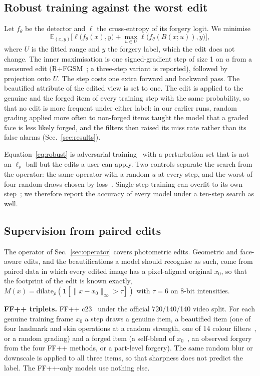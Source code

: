 \subsection{Robust training against the worst edit}
\label{sec:robust}
Let $f_\theta$ be the detector and $\ell$ the cross-entropy of its forgery logit. We minimise
\begin{equation}
\mathbb{E}_{(x,y)}\Big[\ell\big(f_\theta(x),y\big)+\max_{u\in U}\ell\big(f_\theta(B(x;u)),y\big)\Big],
\label{eq:robust}
\end{equation}
where $U$ is the fitted range and $y$ the forgery label, which the edit does not change. The inner maximisation is one
signed-gradient step of size 1 on $u$ from a measured edit (R+FGSM~\cite{tramer2018}; a three-step variant is reported),
followed by projection onto $U$. The step costs one extra forward and backward pass. The beautified attribute of the edited
view is set to one. The edit is applied to the genuine and the forged item of every training step with the same
probability, so that no edit is more frequent under either label: in our earlier runs, random grading applied more often to
non-forged items taught the model that a graded face is less likely forged, and the filters then raised its miss rate rather
than its false alarms (Sec.~\ref{sec:results}).

Equation~\ref{eq:robust} is adversarial training~\cite{madry2018} with a perturbation set that is not an $\ell_p$ ball but
the edits a user can apply. Two controls separate the search from the operator: the same operator with a random $u$ at
every step, and the worst of four random draws chosen by loss~\cite{fatima2025}. Single-step training can overfit to its
own step~\cite{wong2020fast}; we therefore report the accuracy of every model under a ten-step search as well.

\subsection{Supervision from paired edits}
\label{sec:data}
The operator of Sec.~\ref{sec:operator} covers photometric edits. Geometric and face-aware edits, and the
beautifications a model should recognise as such, come from paired data in which every edited image has a pixel-aligned
original $x_0$, so that the footprint of the edit is known exactly, $M(x)=\mathrm{dilate}_\rho(\mathbf{1}[\|x-x_0\|_\infty>\tau])$
with $\tau=6$ on 8-bit intensities.

\textbf{FF++ triplets.} FF++ c23~\cite{ffpp} under the official 720/140/140 video split. For each genuine training frame
$x_0$ a step draws a genuine item, a beautified item (one of four landmark and skin operations at a random strength, one of
14 colour filters~\cite{pilgram}, or a random grading) and a forged item (a self-blend of $x_0$~\cite{sbi}, an observed
forgery from the four FF++ methods, or a part-level forgery). The same random blur or downscale is applied to all three
items, so that sharpness does not predict the label. The FF++-only models use nothing else.

